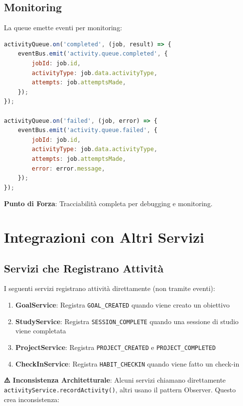 \documentclass[11pt,a4paper]{article}
\begin{document}
\subsection{Monitoring}

La queue emette eventi per monitoring:

\begin{lstlisting}[language=JavaScript]
activityQueue.on('completed', (job, result) => {
    eventBus.emit('activity.queue.completed', {
        jobId: job.id,
        activityType: job.data.activityType,
        attempts: job.attemptsMade,
    });
});

activityQueue.on('failed', (job, error) => {
    eventBus.emit('activity.queue.failed', {
        jobId: job.id,
        activityType: job.data.activityType,
        attempts: job.attemptsMade,
        error: error.message,
    });
});
\end{lstlisting}

\textbf{Punto di Forza}: Tracciabilità completa per debugging e monitoring.

\section{Integrazioni con Altri Servizi}

\subsection{Servizi che Registrano Attività}

I seguenti servizi registrano attività direttamente (non tramite eventi):

\begin{enumerate}
    \item \textbf{GoalService}: Registra \texttt{GOAL_CREATED} quando viene creato un obiettivo
    \item \textbf{StudyService}: Registra \texttt{SESSION_COMPLETE} quando una sessione di studio viene completata
    \item \textbf{ProjectService}: Registra \texttt{PROJECT_CREATED} e \texttt{PROJECT_COMPLETED}
    \item \textbf{CheckInService}: Registra \texttt{HABIT_CHECKIN} quando viene fatto un check-in
\end{enumerate}

\textbf{⚠️ Inconsistenza Architetturale}: Alcuni servizi chiamano direttamente \texttt{activityService.recordActivity()}, altri usano il pattern Observer. Questo crea inconsistenza:
\end{document}
